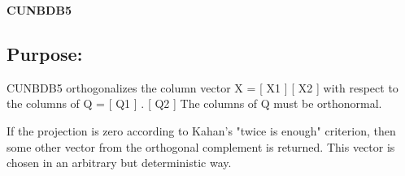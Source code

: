 {\bfseries C\+U\+N\+B\+D\+B5} 

\subsection*{Purpose\+: }

\begin{DoxyVerb} CUNBDB5 orthogonalizes the column vector
      X = [ X1 ]
          [ X2 ]
 with respect to the columns of
      Q = [ Q1 ] .
          [ Q2 ]
 The columns of Q must be orthonormal.

 If the projection is zero according to Kahan's "twice is enough"
 criterion, then some other vector from the orthogonal complement
 is returned. This vector is chosen in an arbitrary but deterministic
 way.\end{DoxyVerb}
 
